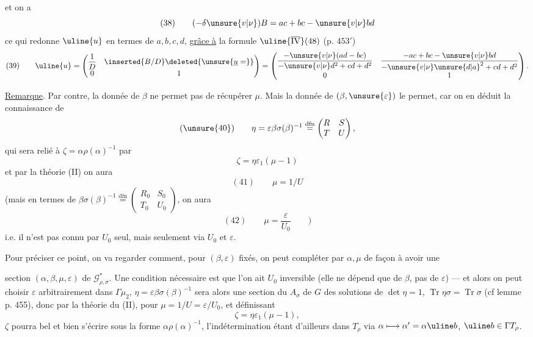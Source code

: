et on a
\[
(38)\qquad (-\delta\unsure{v|\nu})B=ac+bc-\unsure{v|\nu}bd
\]
ce qui redonne $\uline{u}$ en termes de $a,b,c,d$, \uline{grâce à} la formule $\uline{\overline{\mathrm{IV}}}(48)$ (p. $453'$)
\[
(39)\qquad \uline{u}=\begin{pmatrix}\dfrac1D&\inserted{B/D}\deleted{\unsure{\underline u=}}\\0&1\end{pmatrix}
=\begin{pmatrix}
\dfrac{-\unsure{v|\nu}(ad-bc)}{-\unsure{v|\nu}d^2+cd+d^2}&\dfrac{-ac+bc-\unsure{v|\nu}bd}{-\unsure{v|\nu}\unsure{d|a}^2+cd+d^2}\\0&1
\end{pmatrix}.
\]

\uline{Remarque}. Par contre, la donnée de $\beta$   ne permet pas de récupérer $\mu$. Mais la donnée de $(\beta,\unsure{\varepsilon})$ le permet, car on en déduit la connaissance de
\[
(\unsure{40})\qquad \eta=\varepsilon\beta\sigma(\beta)^{-1}\overset{\mathrm{dfn}}=\begin{pmatrix}R&S\\T&U\end{pmatrix},
\]
qui sera relié à $\zeta=\alpha\rho(\alpha)^{-1}$ par
\[
\zeta=\eta\varepsilon_1(\mu-1)
\]
et par la théorie  (II) on aura
\[
(41)\qquad \mu=1/U
\]
(mais en termes de $\beta\sigma(\beta)^{-1}\overset{\mathrm{dfn}}=\begin{pmatrix}R_0&S_0\\T_0&U_0\end{pmatrix}$,
on aura  \unsure{)}
\[
(42)\qquad \mu=\frac{\varepsilon}{U_0}\qquad)
\]
i.e. il n'est  pas connu par $U_0$ seul, mais seulement via $U_0$ et $\varepsilon$. 

Pour préciser ce point, on va regarder  comment, pour $(\beta,\varepsilon)$ fixés, on peut compléter par $\alpha,\mu$ de façon à avoir une

section $(\alpha,\beta,\mu,\varepsilon)$ de $\mathcal G^{*}_{\rho,\sigma}$. Une condition nécessaire est que l'on ait $U_0$ inversible (elle ne dépend que de $\beta$, pas de $\varepsilon$) --- et alors on peut choisir $\varepsilon$ arbitrairement dans $\Gamma\mu_2$,  $\eta=\varepsilon\beta\sigma(\beta)^{-1}$ sera alors une section du  $A_\sigma$  de $G$ des solutions de $\det\eta=1$, $\operatorname{Tr}\eta\sigma=\operatorname{Tr}\sigma$ (cf lemme p. 455), donc par la théorie du (II), pour  $\mu=1/U=\varepsilon/U_0$,  et définissant
\[
\zeta=\eta\varepsilon_1(\mu-1),
\]
$\zeta$ pourra bel et bien s'écrire  sous la forme $\alpha\rho(\alpha)^{-1}$, l'indétermination étant d'ailleurs dans $T_\rho$ via $\alpha\longmapsto\alpha'=\alpha\uline b$, $\uline b\in\Gamma T_\rho$.

